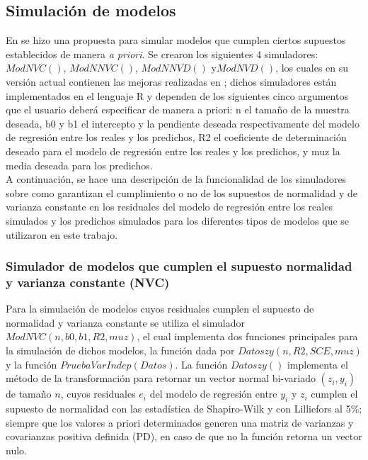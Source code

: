 \subsection{Simulación de modelos}

En \textcite{febles-2014} se hizo una propuesta para simular modelos que cumplen ciertos supuestos establecidos de manera \textit{a priori}. Se crearon los siguientes 4 simuladores: $ModNVC()$, $ModNNVC()$, $ModNNVD()$ y$ ModNVD()$, los cuales en su versión actual contienen las mejoras realizadas en \textcite{zacarias-2023}; dichos simuladores están implementados en el lenguaje R y dependen de los siguientes cinco argumentos que el usuario deberá especificar de manera a priori: n el tamaño de la muestra deseada, b0 y b1 el intercepto y la pendiente deseada respectivamente del modelo de regresión entre los reales y los predichos, R2 el coeficiente de determinación deseado para el modelo de regresión entre los reales y los predichos, y muz la media deseada para los predichos. \\

A continuación, se hace una descripción de la funcionalidad de los simuladores sobre como garantizan el cumplimiento o no de los supuestos de normalidad y de varianza constante en los residuales del modelo de regresión entre los reales simulados y los predichos simulados para los diferentes tipos de modelos que se utilizaron en este trabajo.\\





\subsubsection{Simulador de modelos que cumplen el supuesto normalidad y varianza constante (NVC)}

Para la simulación de modelos cuyos residuales cumplen el supuesto de normalidad y varianza constante se utiliza el simulador $ModNVC(n,b0,b1,R2,muz)$, el cual implementa dos funciones principales para la simulación de dichos modelos, la función dada por \newline $Datoszy(n, R2, SCE, muz)$ y la función $PruebaVarIndep(Datos)$. La función $Datoszy()$ implementa el método de la transformación para retornar un vector normal bi-variado $(z_i,y_i)$ de tamaño $n$, cuyos residuales $e_i$ del  modelo de regresión  entre $y_i$ y $z_i$ cumplen el supuesto de normalidad con las estadística de Shapiro-Wilk y con Lilliefors al 5\%; siempre que los valores a priori determinados generen una matriz de varianzas y covarianzas positiva definida (PD), en caso de que no la función retorna un vector nulo.\\


